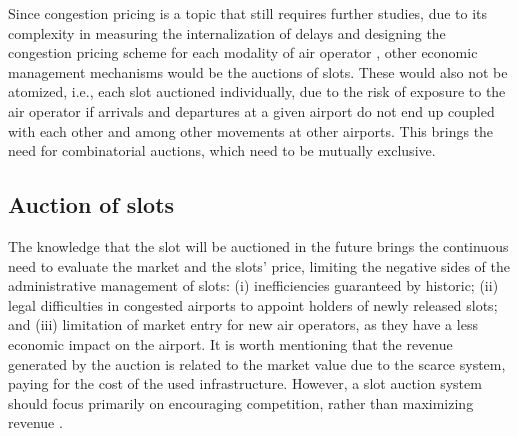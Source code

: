 %

Since congestion pricing is a topic that still requires further studies, due to its complexity in measuring the internalization of delays and designing the congestion pricing scheme for each modality of air operator \cite{gillen2016airport}, other economic management mechanisms would be the auctions of slots. These would also not be atomized, i.e., each slot auctioned individually, due to the risk of exposure to the air operator if arrivals and departures at a given airport do not end up coupled with each other and among other movements at other airports. This brings the need for combinatorial auctions, which need to be mutually exclusive.

\subsection{Auction of slots}

The knowledge that the slot will be auctioned in the future brings the continuous need to evaluate the market and the slots’ price, limiting the negative sides of the administrative management of slots: (i) inefficiencies guaranteed by historic; (ii) legal difficulties in congested airports to appoint holders of newly released slots; and (iii) limitation of market entry for new air operators, as they have a less economic impact on the airport. It is worth mentioning that the revenue generated by the auction is related to the market value due to the scarce system, paying for the cost of the used infrastructure. However, a slot auction system should focus primarily on encouraging competition, rather than maximizing revenue \cite{ball2006auctions}.


